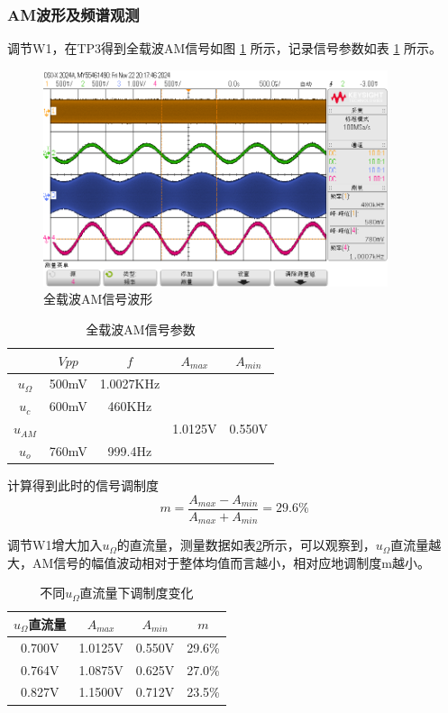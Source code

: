 \documentclass[UTF8]{ctexart}
\begin{document}
\subsubsection{AM波形及频谱观测}
调节W1，在TP3得到全载波AM信号如图 \ref{fig:11} 所示，记录信号参数如表 \ref{tab:1} 所示。
\begin{figure}[H]
    \centering
    \includegraphics[width=0.9\textwidth]{pics/11.png}
    \caption{全载波AM信号波形}\label{fig:11}
\end{figure}
\begin{table}[H]
    \centering
    \vspace{-2em}
    \caption{全载波AM信号参数}
    \label{tab:1}
    \begin{tabular}{c|c|c|c|c}
    \hline
               & $Vpp$ & $f$       & $A_{max}$ & $A_{min}$ \\ \hline
    $u_\Omega$ & 500mV & 1.0027KHz &           &           \\ \hline
    $u_c$      & 600mV & 460KHz    &           &           \\ \hline
    $u_{AM}$   &       &           & 1.0125V   & 0.550V    \\ \hline
    $u_o$      & 760mV & 999.4Hz   &           &           \\ \hline
    \end{tabular}
\end{table}

计算得到此时的信号调制度
$$m=\dfrac{A_{max}-A_{min}}{A_{max}+A_{min}}=29.6\%$$

调节W1增大加入$u_\Omega$的直流量，测量数据如表\ref{tab:2}所示，可以观察到，$u_\Omega$直流量越大，AM信号的幅值波动相对于整体均值而言越小，相对应地调制度m越小。
\begin{table}[H]
    \centering
    \caption{不同$u_\Omega$直流量下调制度变化}
    \label{tab:2}
    \begin{tabular}{c|c|c|c}
    \hline
    $u_{\Omega}$直流量 & $A_{max}$ & $A_{min}$ & $m$    \\ \hline
    0.700V          & 1.0125V   & 0.550V    & 29.6\% \\ \hline
    0.764V          & 1.0875V   & 0.625V    & 27.0\% \\ \hline
    0.827V          & 1.1500V   & 0.712V    & 23.5\% \\ \hline
    \end{tabular}
\end{table}
\end{document}
